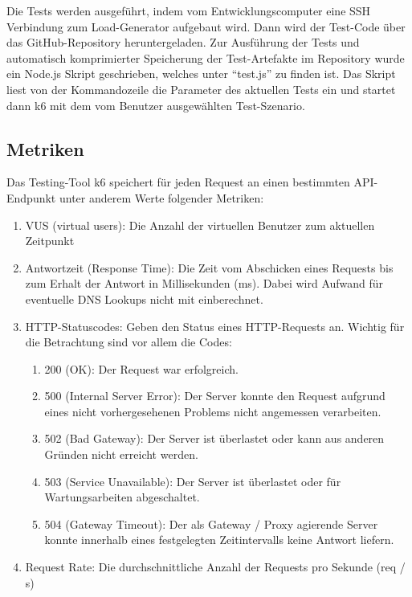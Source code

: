 Die Tests werden ausgeführt, indem vom Entwicklungscomputer eine SSH Verbindung zum Load-Generator aufgebaut wird. Dann wird der Test-Code über das GitHub-Repository heruntergeladen. Zur Ausführung der Tests und automatisch komprimierter Speicherung der Test-Artefakte im Repository wurde ein Node.js Skript geschrieben, welches unter "`test.js"' zu finden ist. Das Skript liest von der Kommandozeile die Parameter des aktuellen Tests ein und startet dann k6 mit dem vom Benutzer ausgewählten Test-Szenario.

\subsection{Metriken}
Das Testing-Tool k6 speichert für jeden Request an einen bestimmten API-Endpunkt unter anderem Werte folgender Metriken:
\begin{enumerate}
    \item VUS (virtual users): Die Anzahl der virtuellen Benutzer zum aktuellen Zeitpunkt 
    
    \item Antwortzeit (Response Time): Die Zeit vom Abschicken eines Requests bis zum Erhalt der Antwort in Millisekunden (ms). Dabei wird Aufwand für eventuelle DNS Lookups nicht mit einberechnet. 
    
    \item HTTP-Statuscodes: Geben den Status eines HTTP-Requests an. Wichtig für die Betrachtung sind vor allem die Codes:
        \begin{enumerate}
            \item 200 (OK): Der Request war erfolgreich\cite{noauthor_200_nodate}.
            \item 500 (Internal Server Error): Der Server konnte den Request aufgrund eines nicht vorhergesehenen Problems nicht angemessen verarbeiten\cite{noauthor_500_nodate}.
            \item 502 (Bad Gateway): Der Server ist überlastet oder kann aus anderen Gründen nicht erreicht werden\cite{noauthor_error_nodate}.
            \item 503 (Service Unavailable): Der Server ist überlastet oder für Wartungsarbeiten abgeschaltet\cite{noauthor_503_nodate}.
            \item 504 (Gateway Timeout): Der als Gateway / Proxy agierende Server konnte innerhalb eines festgelegten Zeitintervalls keine Antwort liefern\cite{noauthor_http_nodate}.
        \end{enumerate}
        
    \item Request Rate: Die durchschnittliche Anzahl der Requests pro Sekunde (req / s)
\end{enumerate}

